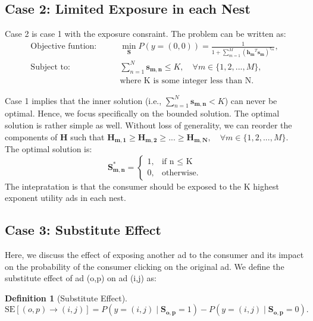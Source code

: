 \documentclass[12pt]{article}
\theoremstyle{definition}
\newtheorem{definition}{Definition}[section]
\newcommand{\matr}[1]{\mathbf{#1}} %
\begin{document}
\begin{sloppypar}
\subsection{Case 2: Limited Exposure in each Nest}
Case 2 is case 1 with the exposure consraint. The problem can be written as:
\begin{align} \label{case2}
    \text{Objective funtion:} \qquad &\min_{\matr{S}} P(y=(0,0)) = \frac{1}{1+\sum_{m=1}^{M}(\matr{h_m}^T \matr{s_m})^{\tau_m}},\nonumber \\
    \text{Subject to:} \qquad &\sum_{n=1}^{N}\matr{s_{m,n}} \leq K, \quad \forall m \in \{1,2,...,M\},\\ &\text{where K is some integer less than N}. \nonumber
\end{align}

Case 1 implies that the inner solution (i.e., $\sum_{n=1}^{N}\matr{s_{m,n}} < K$) can never be optimal. Hence, we focus specifically on the bounded solution. The optimal solution is rather simple as well.
Without loss of generality, we can reorder the components of $\matr{H}$ such that $\matr{H_{m,1}} \geq \matr{H_{m,2}} \geq ... \geq \matr{H_{m,N}}, \quad \forall m \in \{1,2,...,M\}$. The optimal solution is:
\begin{equation}
    \matr{S^*_{m,n}} = 
    \begin{cases}
        1, & \text{if n $\leq$ K} \\
        0, & \text{otherwise}.
    \end{cases}
\end{equation}
The intepratation is that the consumer should be exposed to the K highest exponent utility ads in each nest.

\subsection{Case 3: Substitute Effect}
Here, we discuss the effect of exposing another ad to the consumer and its impact on the probability of the consumer clicking on the original ad. We define the substitute effect of ad (o,p) on ad (i,j) as:
\begin{definition}[Substitute Effect]
    \begin{equation*}
        \mathrm{SE}[(o,p) \rightarrow (i,j)] = P(y=(i,j) \mid \matr{S_{o,p}}=1) - P(y=(i,j) \mid \matr{S_{o,p}}=0).
    \end{equation*}
\end{definition}


\end{sloppypar}
\end{document}
